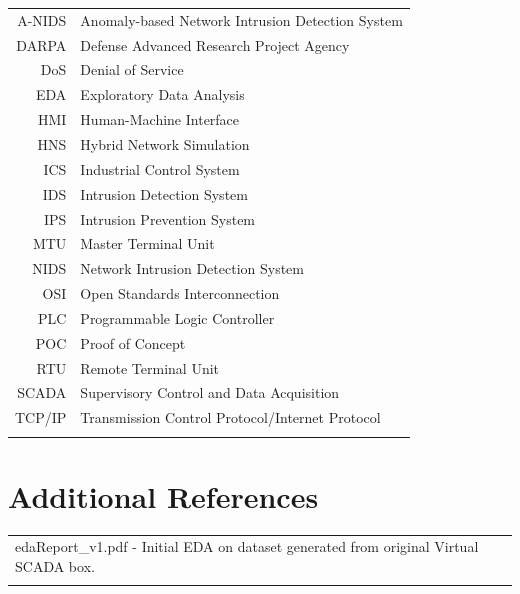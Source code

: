 \documentclass[11pt,]{article}
\begin{document}
\begin{longtable}[c]{@{}rl@{}}
\toprule\addlinespace
A-NIDS & Anomaly-based Network Intrusion Detection System
\\\addlinespace
DARPA & Defense Advanced Research Project Agency
\\\addlinespace
DoS & Denial of Service
\\\addlinespace
EDA & Exploratory Data Analysis
\\\addlinespace
HMI & Human-Machine Interface
\\\addlinespace
HNS & Hybrid Network Simulation
\\\addlinespace
ICS & Industrial Control System
\\\addlinespace
IDS & Intrusion Detection System
\\\addlinespace
IPS & Intrusion Prevention System
\\\addlinespace
MTU & Master Terminal Unit
\\\addlinespace
NIDS & Network Intrusion Detection System
\\\addlinespace
OSI & Open Standards Interconnection
\\\addlinespace
PLC & Programmable Logic Controller
\\\addlinespace
POC & Proof of Concept
\\\addlinespace
RTU & Remote Terminal Unit
\\\addlinespace
SCADA & Supervisory Control and Data Acquisition
\\\addlinespace
TCP/IP & Transmission Control Protocol/Internet Protocol
\\\addlinespace
\bottomrule
\end{longtable}

\section*{Additional References}\label{additional-references}

\begin{longtable}[c]{@{}l@{}}
\toprule\addlinespace
edaReport\_v1.pdf - Initial EDA on dataset generated from original
Virtual SCADA box.
\\\addlinespace
\bottomrule
\end{longtable}

\newpage
\mbox{} \thispagestyle{empty}

\clearpage
{}

\setcounter{page}{17}
\end{document}
